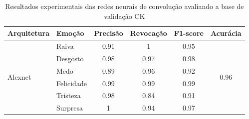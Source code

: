 


\begin{table}[]
\centering
\caption{Resultados experimentais das redes neurais de convolução avaliando a base de validação CK}
\label{table:ck}
\begin{tabular}{llcccc}
\hline
\textbf{Arquitetura}                   & \textbf{Emoção}       & \multicolumn{1}{l}{\textbf{Precisão}} & \multicolumn{1}{l}{\textbf{Revocação}} & \multicolumn{1}{l}{\textbf{F1-score}} & \multicolumn{1}{l}{\textbf{Acurácia}} \\ \hline
\multirow{8}{*}{Alexnet}         & Raiva                 & 0.91                                  & 1                                      & 0.95                                  & \multirow{8}{*}{0.96}                 \\
                                       & Desgosto              & 0.98                                  & 0.97                                   & 0.98                                  &                                       \\
                                       & Medo                  & 0.89                                  & 0.96                                   & 0.92                                  &                                       \\
                                       & Felicidade            & 0.99                                  & 0.99                                   & 0.99                                  &                                       \\
                                       & Tristeza              & 0.98                                  & 0.84                                   & 0.91                                  &                                       \\
                                       & Surpresa              & 1                                     & 0.94                                   & 0.97                                  &                                       \\

\end{tabular}
\end{table}
